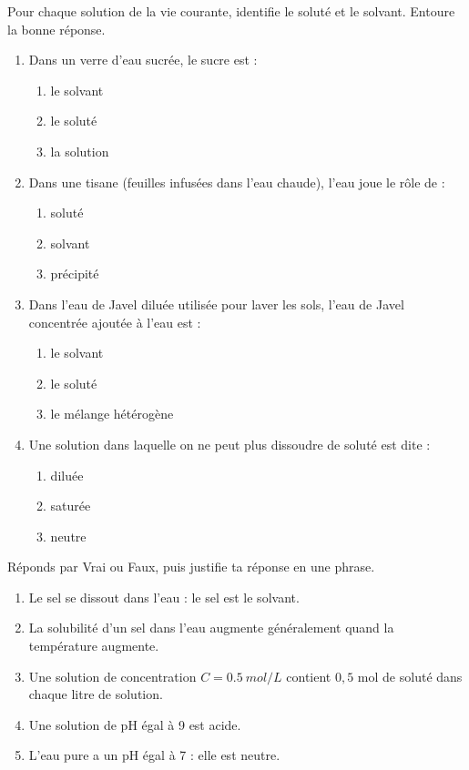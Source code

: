 \documentclass[11pt]{article}
\newcommand{\cle}[1]{{\popxbold\color{popdark}#1}}
\begin{document}
\begin{exercice}
Pour chaque solution de la vie courante, identifie le \cle{soluté} et le \cle{solvant}. Entoure la bonne réponse.

\begin{enumerate}
\item Dans un verre d'eau sucrée, le sucre est :
\begin{enumerate}
\item le solvant \item le soluté \item la solution
\end{enumerate}
\item Dans une tisane (feuilles infusées dans l'eau chaude), l'eau joue le rôle de :
\begin{enumerate}
\item soluté \item solvant \item précipité
\end{enumerate}
\item Dans l'eau de Javel diluée utilisée pour laver les sols, l'eau de Javel concentrée ajoutée à l'eau est :
\begin{enumerate}
\item le solvant \item le soluté \item le mélange hétérogène
\end{enumerate}
\item Une solution dans laquelle on ne peut plus dissoudre de soluté est dite :
\begin{enumerate}
\item diluée \item saturée \item neutre
\end{enumerate}
\end{enumerate}
\end{exercice}

\begin{exercice}
Réponds par Vrai ou Faux, puis justifie ta réponse en une phrase.

\begin{enumerate}
\item Le sel se dissout dans l'eau : le sel est le solvant.
\item La solubilité d'un sel dans l'eau augmente généralement quand la température augmente.
\item Une solution de concentration $C = \SI{0,5}{mol/L}$ contient $0,5$ mol de soluté dans chaque litre de solution.
\item Une solution de pH égal à 9 est acide.
\item L'eau pure a un pH égal à 7 : elle est neutre.
\end{enumerate}
\end{exercice}
\end{document}
